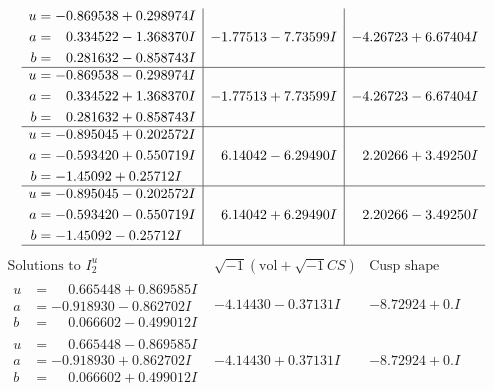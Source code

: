 \documentclass[1p]{elsarticle_modified}
\theoremstyle{definition}
\newcommand{\I}{\sqrt{-1}}
\begin{document}
$$\begin{array}{c|c|c}
\begin{aligned}
u &= -0.869538 + 0.298974 I \\
a &= \phantom{-}0.334522 - 1.368370 I \\
b &= \phantom{-}0.281632 - 0.858743 I\end{aligned}
 & -1.77513 - 7.73599 I & -4.26723 + 6.67404 I \\ \hline\begin{aligned}
u &= -0.869538 - 0.298974 I \\
a &= \phantom{-}0.334522 + 1.368370 I \\
b &= \phantom{-}0.281632 + 0.858743 I\end{aligned}
 & -1.77513 + 7.73599 I & -4.26723 - 6.67404 I \\ \hline\begin{aligned}
u &= -0.895045 + 0.202572 I \\
a &= -0.593420 + 0.550719 I \\
b &= -1.45092 + 0.25712 I\end{aligned}
 & \phantom{-}6.14042 - 6.29490 I & \phantom{-}2.20266 + 3.49250 I \\ \hline\begin{aligned}
u &= -0.895045 - 0.202572 I \\
a &= -0.593420 - 0.550719 I \\
b &= -1.45092 - 0.25712 I\end{aligned}
 & \phantom{-}6.14042 + 6.29490 I & \phantom{-}2.20266 - 3.49250 I\\
 \hline 
 \end{array}$$\newpage$$\begin{array}{c|c|c}  
\text{Solutions to }I^u_{2}& \I (\text{vol} + \sqrt{-1}CS) & \text{Cusp shape}\\
 \hline 
\begin{aligned}
u &= \phantom{-}0.665448 + 0.869585 I \\
a &= -0.918930 - 0.862702 I \\
b &= \phantom{-}0.066602 - 0.499012 I\end{aligned}
 & -4.14430 - 0.37131 I & -8.72924 + 0. I\phantom{ +0.000000I} \\ \hline\begin{aligned}
u &= \phantom{-}0.665448 - 0.869585 I \\
a &= -0.918930 + 0.862702 I \\
b &= \phantom{-}0.066602 + 0.499012 I\end{aligned}
 & -4.14430 + 0.37131 I & -8.72924 + 0. I\phantom{ +0.000000I} \\ \hline\begin{aligned}

\end{aligned}
\end{array}$$
\end{document}

